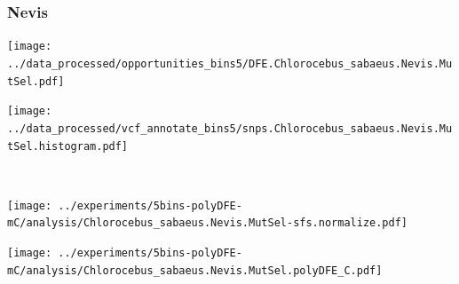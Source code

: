 \subsubsection{Nevis}

\begin{minipage}{0.49\linewidth}
    \texttt{[image: ../data\_processed/opportunities\_bins5/DFE.Chlorocebus\_sabaeus.Nevis.MutSel.pdf]}
\end{minipage}
\begin{minipage}{0.49\linewidth}
    \texttt{[image: ../data\_processed/vcf\_annotate\_bins5/snps.Chlorocebus\_sabaeus.Nevis.MutSel.histogram.pdf]}
\end{minipage}
\\
\begin{minipage}{0.49\linewidth}
    \texttt{[image: ../experiments/5bins-polyDFE-mC/analysis/Chlorocebus\_sabaeus.Nevis.MutSel-sfs.normalize.pdf]}
\end{minipage}
\begin{minipage}{0.4\linewidth}
    \texttt{[image: ../experiments/5bins-polyDFE-mC/analysis/Chlorocebus\_sabaeus.Nevis.MutSel.polyDFE\_C.pdf]}
\end{minipage}
